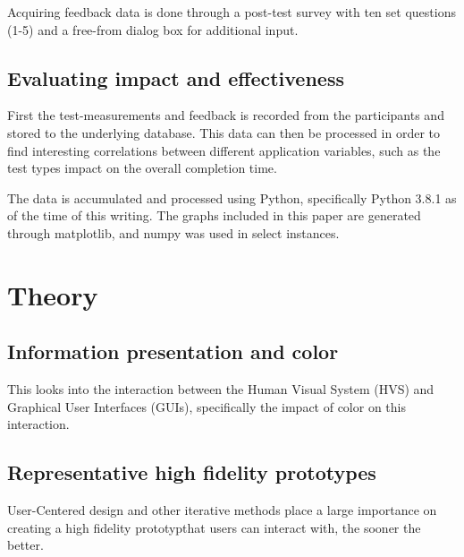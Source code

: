 \documentclass[nofilelist,dvipsnames]{cslthse-msc}
\begin{document}
        Acquiring feedback data is done through a post-test survey with ten set
        questions (1-5) and a free-from dialog box for additional input.


      \subsection{Evaluating impact and effectiveness}

        First the test-measurements and feedback is recorded from the
        participants and stored to the underlying database. This data can then
        be processed in order to find interesting correlations between
        different application variables, such as the test types impact on the
        overall completion time.

        The data is accumulated and processed using Python, specifically Python
        3.8.1 as of the time of this writing. The graphs included in this paper
        are generated through matplotlib, and numpy was used in select
        instances.



		\section{Theory}

			\subsection{Information presentation and color}

        This looks into the interaction between the Human Visual System (HVS)
        and Graphical User Interfaces (GUIs), specifically the impact of color
        on this interaction.


			\subsection{Representative high fidelity prototypes}

        User-Centered design and other iterative methods place a large
        importance on creating a high fidelity prototyp\findref that users can interact
        with, the sooner the better\findref.
\end{document}
